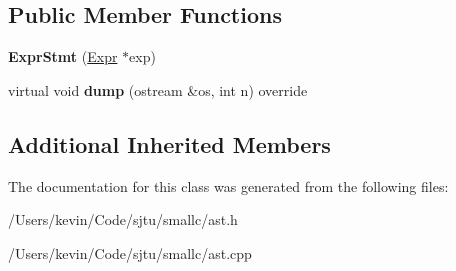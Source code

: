 \subsection*{Public Member Functions}
\begin{DoxyCompactItemize}
\item 
\mbox{\label{class_expr_stmt_aed258a5f037345f06b6a9962c8a43514}} 
{\bfseries Expr\+Stmt} (\hyperlink{class_expr}{Expr} $\ast$exp)
\item 
\mbox{\label{class_expr_stmt_a9bf6da4398579a653e547d2ace3493d0}} 
virtual void {\bfseries dump} (ostream \&os, int n) override
\end{DoxyCompactItemize}
\subsection*{Additional Inherited Members}


The documentation for this class was generated from the following files\+:\begin{DoxyCompactItemize}
\item 
/\+Users/kevin/\+Code/sjtu/smallc/ast.\+h\item 
/\+Users/kevin/\+Code/sjtu/smallc/ast.\+cpp\end{DoxyCompactItemize}
